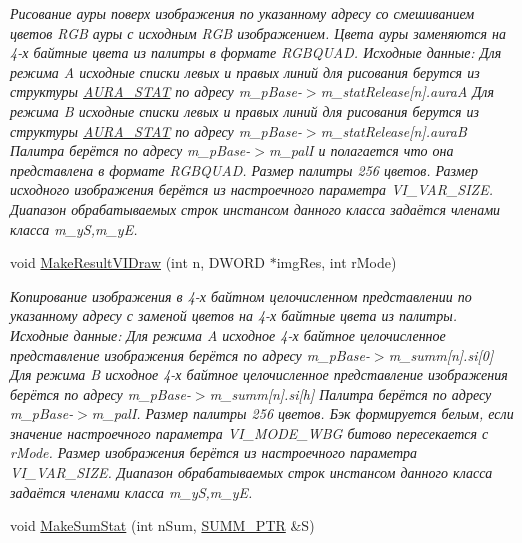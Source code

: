 \begin{DoxyCompactItemize}
\begin{DoxyCompactList}\small\item\em Рисование ауры поверх изображения по указанному адресу со смешиванием цветов R\+G\+B ауры с исходным R\+G\+B изображением. Цвета ауры заменяются на 4-\/х байтные цвета из палитры в формате R\+G\+B\+Q\+U\+A\+D. Исходные данные\+: Для режима A исходные списки левых и правых линий для рисования берутся из структуры \hyperlink{class_a_u_r_a___s_t_a_t}{A\+U\+R\+A\+\_\+\+S\+T\+A\+T} по адресу m\+\_\+p\+Base-\/$>$m\+\_\+stat\+Release\mbox{[}n\mbox{]}.aura\+A Для режима B исходные списки левых и правых линий для рисования берутся из структуры \hyperlink{class_a_u_r_a___s_t_a_t}{A\+U\+R\+A\+\_\+\+S\+T\+A\+T} по адресу m\+\_\+p\+Base-\/$>$m\+\_\+stat\+Release\mbox{[}n\mbox{]}.aura\+B Палитра берётся по адресу m\+\_\+p\+Base-\/$>$m\+\_\+pal\+I и полагается что она представлена в формате R\+G\+B\+Q\+U\+A\+D. Размер палитры 256 цветов. Размер исходного изображения берётся из настроечного параметра V\+I\+\_\+\+V\+A\+R\+\_\+\+S\+I\+Z\+E. Диапазон обрабатываемых строк инстансом данного класса задаётся членами класса m\+\_\+y\+S,m\+\_\+y\+E. \end{DoxyCompactList}\item 
void \hyperlink{class_c_v_i_engine_thread_abf2a40038d465ccb943072431774c6ae}{Make\+Result\+V\+I\+Draw} (int n, D\+W\+O\+R\+D $\ast$img\+Res, int r\+Mode)
\begin{DoxyCompactList}\small\item\em Копирование изображения в 4-\/х байтном целочисленном представлении по указанному адресу с заменой цветов на 4-\/х байтные цвета из палитры. Исходные данные\+: Для режима A исходное 4-\/х байтное целочисленное представление изображения берётся по адресу m\+\_\+p\+Base-\/$>$m\+\_\+summ\mbox{[}n\mbox{]}.si\mbox{[}0\mbox{]} Для режима B исходное 4-\/х байтное целочисленное представление изображения берётся по адресу m\+\_\+p\+Base-\/$>$m\+\_\+summ\mbox{[}n\mbox{]}.si\mbox{[}h\mbox{]} Палитра берётся по адресу m\+\_\+p\+Base-\/$>$m\+\_\+pal\+I. Размер палитры 256 цветов. Бэк формируется белым, если значение настроечного параметра V\+I\+\_\+\+M\+O\+D\+E\+\_\+\+W\+B\+G битово пересекается с r\+Mode. Размер изображения берётся из настроечного параметра V\+I\+\_\+\+V\+A\+R\+\_\+\+S\+I\+Z\+E. Диапазон обрабатываемых строк инстансом данного класса задаётся членами класса m\+\_\+y\+S,m\+\_\+y\+E. \end{DoxyCompactList}\item 
void \hyperlink{class_c_v_i_engine_thread_a6e69080c6da14f8bb61c0615180bd088}{Make\+Sum\+Stat} (int n\+Sum, \hyperlink{struct_c_v_i_engine_thread_1_1tag_s_u_m_m___p_t_r}{S\+U\+M\+M\+\_\+\+P\+T\+R} \&S)

\end{DoxyCompactItemize}
